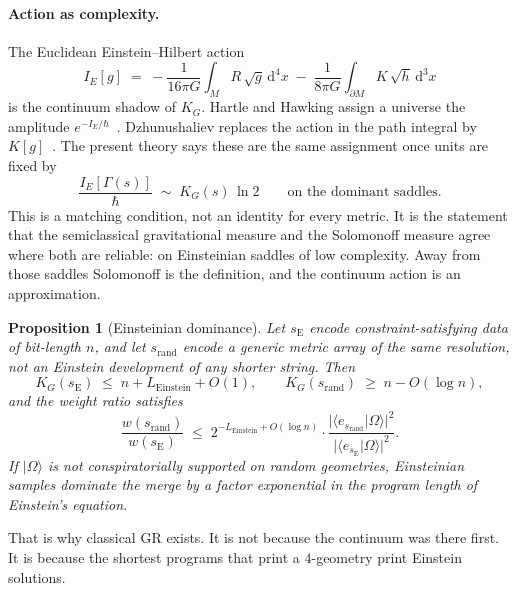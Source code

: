 \documentclass[11pt,a4paper]{article}
\theoremstyle{plain}
\newtheorem{proposition}[theorem]{Proposition}
\theoremstyle{definition}
\theoremstyle{remark}
\newcommand{\KG}{K_{G}}
\newcommand{\abs}[1]{\lvert#1\rvert}
\newcommand{\ket}[1]{\lvert#1\rangle}
\newcommand{\braket}[2]{\langle#1|#2\rangle}
\newcommand{\dd}{\mathrm{d}}
\begin{document}
\paragraph{Action as complexity.}
The Euclidean Einstein--Hilbert action
\begin{equation}
  I_{E}[g] \;=\; -\frac{1}{16\pi G}\int_{M}\!R\,\sqrt{g}\,\dd^{4}x \;-\; \frac{1}{8\pi G}\int_{\partial M}\!K\,\sqrt{h}\,\dd^{3}x
\end{equation}
is the continuum shadow of $\KG$.
Hartle and Hawking assign a universe the amplitude $e^{-I_{E}/\hbar}$~\cite{hartle1983}.
Dzhunushaliev replaces the action in the path integral by $K[g]$~\cite{dzhunushaliev1998}.
The present theory says these are the same assignment once units are fixed by
\begin{equation}
  \frac{I_{E}[\Gamma(s)]}{\hbar} \;\sim\; \KG(s)\,\ln 2 \qquad \text{on the dominant saddles}.
  \label{eq:action-K}
\end{equation}
This is a matching condition, not an identity for every metric.
It is the statement that the semiclassical gravitational measure and the Solomonoff measure agree where both are reliable: on Einsteinian saddles of low complexity.
Away from those saddles Solomonoff is the definition, and the continuum action is an approximation.

\begin{proposition}[Einsteinian dominance]
\label{prop:einstein-dom}
Let $s_{\mathrm{E}}$ encode constraint-satisfying data of bit-length $n$, and let $s_{\mathrm{rand}}$ encode a generic metric array of the same resolution, not an Einstein development of any shorter string.
Then
\begin{equation}
  \KG(s_{\mathrm{E}}) \;\le\; n + L_{\mathrm{Einstein}} + O(1), \qquad \KG(s_{\mathrm{rand}}) \;\ge\; n - O(\log n),
\end{equation}
and the weight ratio satisfies
\begin{equation}
  \frac{w(s_{\mathrm{rand}})}{w(s_{\mathrm{E}})} \;\le\; 2^{-L_{\mathrm{Einstein}}+O(\log n)}\cdot \frac{\abs{\braket{e_{s_{\mathrm{rand}}}}{\Omega}}^{2}}{\abs{\braket{e_{s_{\mathrm{E}}}}{\Omega}}^{2}}.
\end{equation}
If $\ket{\Omega}$ is not conspiratorially supported on random geometries, Einsteinian samples dominate the merge by a factor exponential in the program length of Einstein's equation.
\end{proposition}

That is why classical GR exists.
It is not because the continuum was there first.
It is because the shortest programs that print a $4$-geometry print Einstein solutions.
\end{document}
